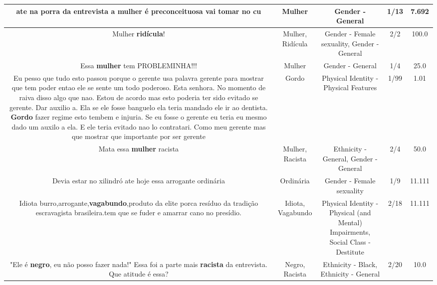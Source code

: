 \documentclass[11pt]{article}
\newlength\mylength
\begin{document}
\begin{center}
\begin{longtable}{|C{.65\mylength}|C{.30\mylength}|C{.12\mylength}|C{.12\mylength}|C{.12\mylength}|}
  \small ate na porra da entrevista a \textbf{mulher} é preconceituosa vai tomar no cu\normalsize   & Mulher & Gender - General & 1/13 & 7.692 \\  \hline
  \small Mulher \textbf{ridícula}!\normalsize   & Mulher, Ridícula & Gender - Female sexuality, Gender - General & 2/2 & 100.0 \\  \hline
  \small Essa \textbf{mulher} tem PROBLEMINHA!!!\normalsize   & Mulher & Gender - General & 1/4 & 25.0 \\  \hline
  \small Eu pesso que tudo esto passou porque o gerente usa palavra gerente para mostrar que tem poder entao ele se sente um todo poderoso. Esta senhora. No momento de raiva disso algo que nao. Estou de acordo mas esto poderia ter sido evitado se gerente. Dar auxilio a. Ela se ele fosse banguelo ela teria mandado ele ir ao dentista. \textbf{Gordo} fazer regime esto tembem e injuria. Se eu fosse o gerente eu teria eu mesmo dado um auxilo a ela. E ele teria evitado nao lo contratari. Como meu gerente mas que mostrar que importante por ser gerente\normalsize   & Gordo & Physical Identity - Physical Features & 1/99 & 1.01 \\  \hline
  \small Mata essa \textbf{mulher} racista\normalsize   & Mulher, Racista & Ethnicity - General, Gender - General & 2/4 & 50.0 \\  \hline
  \small Devia estar no xilindró ate hoje essa arrogante ordinária\normalsize   & Ordinária & Gender - Female sexuality & 1/9 & 11.111 \\  \hline
  \small Idiota burro,arrogante,\textbf{vagabundo},produto da elite porca resíduo da tradição escravagista brasileira.tem que se fuder e amarrar cano no presídio.\normalsize   & Idiota, Vagabundo & Physical Identity - Physical (and Mental) Impairments, Social Class - Destitute & 2/18 & 11.111 \\  \hline
  \small "Ele é \textbf{negro}, eu não posso fazer nada!" Essa foi a parte mais \textbf{racista} da entrevista. Que atitude é essa?\normalsize   & Negro, Racista & Ethnicity - Black, Ethnicity - General & 2/20 & 10.0 \\  \hline

\end{longtable}
\end{center}
\end{document}
